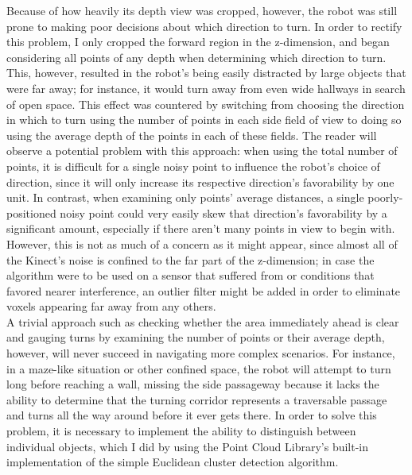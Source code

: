 \documentclass[12pt]{report}
\begin{document}
Because of how heavily its depth view was cropped, however, the robot was still prone to making poor decisions about which direction to turn.  In order to rectify this problem, I only cropped the forward region in the z-dimension, and began considering all points of any depth when determining which direction to turn.  This, however, resulted in the robot's being easily distracted by large objects that were far away; for instance, it would turn away from even wide hallways in search of open space.  This effect was countered by switching from choosing the direction in which to turn using the number of points in each side field of view to doing so using the average depth of the points in each of these fields.  The reader will observe a potential problem with this approach: when using the total number of points, it is difficult for a single noisy point to influence the robot's choice of direction, since it will only increase its respective direction's favorability by one unit.  In contrast, when examining only points' average distances, a single poorly-positioned noisy point could very easily skew that direction's favorability by a significant amount, especially if there aren't many points in view to begin with.  However, this is not as much of a concern as it might appear, since almost all of the Kinect's noise is confined to the far part of the z-dimension; in case the algorithm were to be used on a sensor that suffered from or conditions that favored nearer interference, an outlier filter might be added in order to eliminate voxels appearing far away from any others. \\
A trivial approach such as checking whether the area immediately ahead is clear and gauging turns by examining the number of points or their average depth, however, will never succeed in navigating more complex scenarios.  For instance, in a maze-like situation or other confined space, the robot will attempt to turn long before reaching a wall, missing the side passageway because it lacks the ability to determine that the turning corridor represents a traversable passage and turns all the way around before it ever gets there.  In order to solve this problem, it is necessary to implement the ability to distinguish between individual objects, which I did by using the Point Cloud Library's built-in implementation of the simple Euclidean cluster detection algorithm. \\
\end{document}
